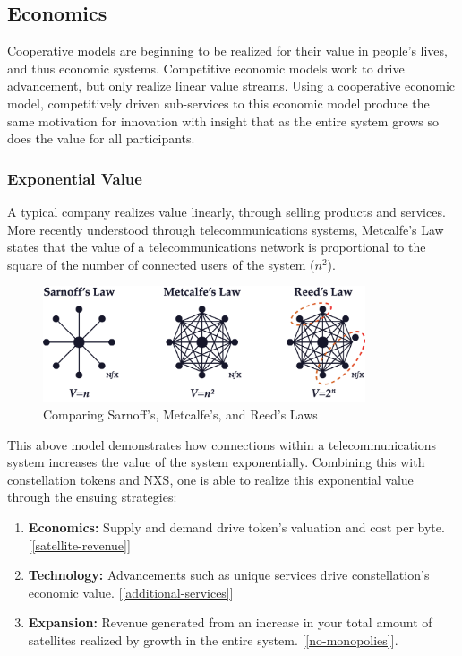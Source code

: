 \documentclass[11pt]{article}
\begin{document}
\subsection{Economics}

Cooperative models are beginning to be realized for their value in people's lives, and thus economic systems.
Competitive economic models work to drive advancement, but only realize linear value streams.
Using a cooperative economic model, competitively driven sub-services to this economic model produce the same motivation for innovation with insight that as the entire system grows so does the value for all participants.

\subsubsection{Exponential Value}
\label{exponential-value}

A typical company realizes value linearly, through selling products and services. 
More recently understood through telecommunications systems, Metcalfe's Law states that the value of a telecommunications network is proportional to the square of the number of connected users of the system ($n^2$).

\begin{figure}[h]
    \centering
    \includegraphics[width=0.85\textwidth]{./images/rsz_metcalfe.png} 
    \caption{Comparing Sarnoff's, Metcalfe's, and Reed's Laws \cite{metcalfs-law}}
\end{figure}

\noindent This above model demonstrates how connections within a telecommunications system increases the value of the system exponentially.
Combining this with constellation tokens and NXS, one is able to realize this exponential value through the ensuing strategies:

\begin{enumerate}
    \item \textbf{Economics:} Supply and demand drive token's valuation and cost per byte. [\ref{satellite-revenue}]
    \item \textbf{Technology:} Advancements such as unique services drive constellation's economic value. [\ref{additional-services}]
    \item \textbf{Expansion:} Revenue generated from an increase in your total amount of satellites realized by growth in the entire system. [\ref{no-monopolies}].
\end{enumerate}
\end{document}
